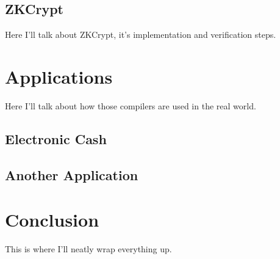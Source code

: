 \documentclass{sig-alternate}
\begin{document}
	\subsection{ZKCrypt}
		Here I'll talk about ZKCrypt, it's implementation and verification steps.

\section{Applications}
	Here I'll talk about how those compilers are used in the real world.
	
	\subsection{Electronic Cash}
	
	\subsection{Another Application}

\section{Conclusion}
	This is where I'll neatly wrap everything up.




\end{document}
